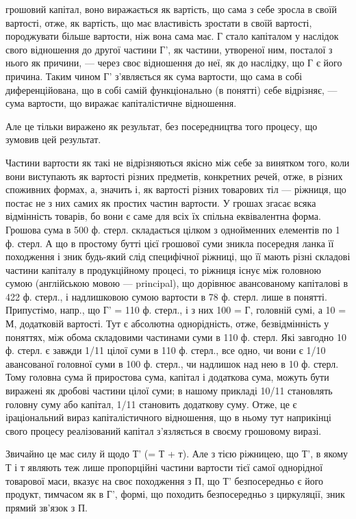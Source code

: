 \parcont{}  %
грошовий капітал, воно виражається як вартість, що сама з себе зросла
в своїй вартості, отже, як вартість, що має властивість зростати в своїй
вартості, породжувати більше вартости, ніж вона сама має. Г стало капіталом
у наслідок свого відношення до другої частини Г', як частини,
утвореної ним, посталої з нього як причини, — через своє відношення до
неї, як до наслідку, що Г є його причина. Таким чином Г' з’являється
як сума вартости, що сама в собі диференційована, що в собі самій функціонально
(в понятті) себе відрізняє, — сума вартости, що виражає капіталістичне
відношення.

Але це тільки виражено як результат, без посередництва того процесу,
що зумовив цей результат.

Частини вартости як такі не відрізняються якісно між себе за винятком
того, коли вони виступають як вартості різних предметів, конкретних
речей, отже, в різних споживних формах, а, значить і, як вартості
різних товарових тіл — ріжниця, що постає не з них самих як простих
частин вартости. У грошах згасає всяка відмінність товарів, бо вони є
саме для всіх їх спільна еквівалентна форма. Грошова сума в 500 ф.
стерл. складається цілком з однойменних елементів по 1 ф. стерл. А що
в простому бутті цієї грошової суми зникла посередня ланка її походження
і зник будь-який слід специфічної ріжниці, що її мають різні
складові частини капіталу в продукційному процесі, то ріжниця існує
між головною сумою (англійською мовою — principal), що дорівнює
авансованому капіталові в 422 ф. стерл., і надлишковою сумою вартости
в 78 ф. стерл. лише в понятті. Припустімо, напр., що Г' = 110 ф. стерл.,
і з них 100 = Г, головній сумі, а 10 = М, додатковій вартості. Тут
є абсолютна однорідність, отже, безвідмінність у поняттях, між обома
складовими частинами суми в 110 ф. стерл. Які завгодно 10 ф. стерл.
є завжди 1/11 цілої суми в 110 ф. стерл., все одно, чи вони є 1/10 авансованої
головної суми в 100 ф. стерл., чи надлишок над нею в 10 ф. стерл.
Тому головна сума й приростова сума, капітал і додаткова сума, можуть
бути виражені як дробові частини цілої суми; в нашому прикладі 10/11 становлять
головну суму або капітал, 1/11 становить додаткову суму. Отже, це є
іраціональний вираз капіталістичного відношення, що в ньому тут наприкінці
свого процесу реалізований капітал з’язляється в своєму грошовому виразі.

Звичайно це має силу й щодо Т' (= Т + т). Але з тією ріжницею, що
Т', в якому Т і т являють теж лише пропорційні частини вартости тієї
самої однорідної товарової маси, вказує на своє походження з П, що Т'
безпосередньо є його продукт, тимчасом як в Г', формі, що походить
безпосередньо з циркуляції, зник прямий зв’язок з П.

